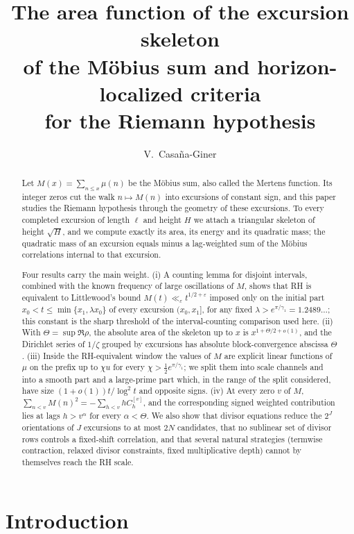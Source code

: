 \documentclass[11pt,reqno]{amsart}
\title[The excursion skeleton of the Möbius sum]{The area function of the excursion skeleton\\ of the Möbius sum and
horizon-localized criteria\\ for the Riemann hypothesis}
\author{V.~Casa\~na-Giner}
\date{}
\numberwithin{equation}{section}
\theoremstyle{plain}
\theoremstyle{definition}
\theoremstyle{remark}
\newcommand{\eps}{\varepsilon}
\begin{document}
\begin{abstract}
Let $M(x)=\sum_{n\le x}\mu(n)$ be the Möbius sum, also called the Mertens
function. Its integer zeros cut the walk $n\mapsto M(n)$ into excursions of
constant sign, and this paper studies the Riemann hypothesis through the
geometry of these excursions. To every completed excursion of length $\ell$
and height $H$ we attach a triangular skeleton of height $\sqrt H$, and we
compute exactly its area, its energy and its quadratic mass; the quadratic
mass of an excursion equals minus a lag-weighted sum of the Möbius
correlations internal to that excursion.

Four results carry the main weight. (i) A counting lemma for disjoint
intervals, combined with the known frequency of large oscillations of $M$,
shows that RH is equivalent to Littlewood's bound
$M(t)\ll_\eps t^{1/2+\eps}$ imposed only on the initial part
$x_0<t\le\min\{x_1,\lambda x_0\}$ of every excursion $(x_0,x_1]$, for any
fixed $\lambda>e^{\pi/\gamma_1}=1.2489\ldots$; this constant is the sharp threshold of the interval-counting comparison used here. (ii) With $\Theta=\sup\Re\rho$, the absolute area of the skeleton up
to $x$ is $x^{1+\Theta/2+o(1)}$, and the Dirichlet series of $1/\zeta$
grouped by excursions has absolute block-convergence abscissa $\Theta$. (iii) Inside the RH-equivalent window the values of
$M$ are explicit linear functions of $\mu$ on the prefix up to $\chi u$ for
every $\chi>\frac12e^{\pi/\gamma_1}$; we split them into scale channels and
into a smooth part and a large-prime part which, in the range of the split
considered, have size $(1+o(1))t/\log^2t$ and opposite signs.
(iv) At every zero $v$ of $M$,
$\sum_{n<v}M(n)^2=-\sum_{h<v}hC_h^{[v]}$, and the corresponding signed weighted contribution lies at
lags $h>v^\alpha$ for every $\alpha<\Theta$. We also show that divisor
equations reduce the $2^J$ orientations of $J$ excursions to at most $2N$
candidates, that no sublinear set of divisor rows controls a fixed-shift
correlation, and that several natural strategies (termwise contraction,
relaxed divisor constraints, fixed multiplicative depth) cannot by
themselves reach the RH scale.
\end{abstract}

\maketitle

\tableofcontents

\section{Introduction}
\label{sec:introduction}
\end{document}
